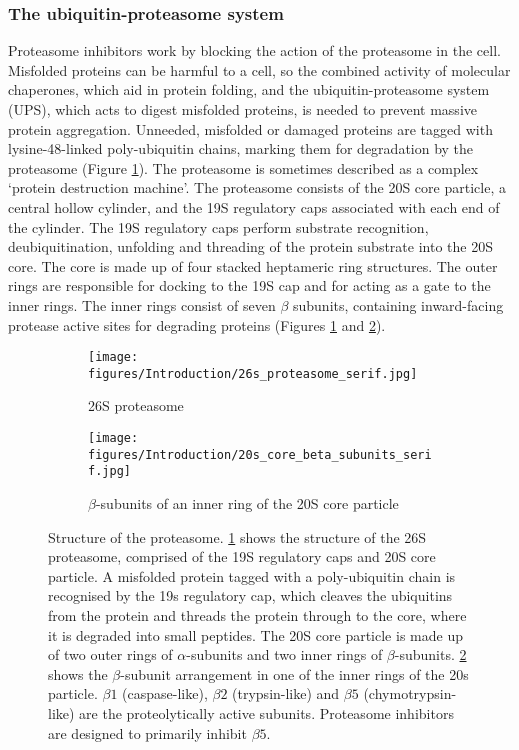 \subsubsection{The ubiquitin-proteasome system}
Proteasome inhibitors work by blocking the action of the proteasome in the cell.
Misfolded proteins can be harmful to a cell, so the combined activity of molecular chaperones, which aid in protein folding, and the ubiquitin-proteasome system (UPS), which acts to digest misfolded proteins, is needed to prevent massive protein aggregation.
Unneeded, misfolded or damaged proteins are tagged with lysine-48-linked poly-ubiquitin chains, marking them for degradation by the proteasome (Figure \ref{fig:26s_proteasome_structure}).
The proteasome is sometimes described as a complex `protein destruction machine'.
The proteasome consists of the 20S core particle, a central hollow cylinder, and the 19S regulatory caps associated with each end of the cylinder.
The 19S regulatory caps perform substrate recognition, deubiquitination, unfolding and threading of the protein substrate into the 20S core.
The core is made up of four stacked heptameric ring structures.
The outer rings are responsible for docking to the 19S cap and for acting as a gate to the inner rings. The inner rings consist of seven $\beta$ subunits, containing inward-facing protease active sites for degrading proteins\cite{kleiger2014perilous, alberts2007molecular} (Figures \ref{fig:26s_proteasome_structure} and  \ref{fig:proteasome_beta_subunits}).

\begin{figure}[ht]
\begin{subfigure}[t]{0.5\textwidth}
    \texttt{[image: figures/Introduction/26s\_proteasome\_serif.jpg]}
    \caption{26S proteasome}
    \label{fig:26s_proteasome_structure}
\end{subfigure}
\begin{subfigure}[t]{0.5\textwidth}
    \texttt{[image: figures/Introduction/20s\_core\_beta\_subunits\_serif.jpg]}
    \caption{$\beta$-subunits of an inner ring of the 20S core particle }
    \label{fig:proteasome_beta_subunits}
\end{subfigure}
    \caption[Structure of the proteasome]{Structure of the proteasome. \ref{fig:26s_proteasome_structure} shows the structure of the 26S proteasome, comprised of the 19S regulatory caps and 20S core particle.
    A misfolded protein tagged with a poly-ubiquitin chain is recognised by the 19s regulatory cap, which cleaves the ubiquitins from the protein and threads the protein through to the core, where it is degraded into small peptides.
    The 20S core particle is made up of two outer rings of $\alpha$-subunits and two inner rings of $\beta$-subunits.
    \ref{fig:proteasome_beta_subunits} shows the $\beta$-subunit arrangement in one of the inner rings of the 20s particle.
    $\beta1$ (caspase-like), $\beta2$ (trypsin-like) and $\beta5$ (chymotrypsin-like) are the proteolytically active subunits.
    Proteasome inhibitors are designed to primarily inhibit $\beta5$.}
\label{fig:proteasome_and_beta}
\end{figure}

